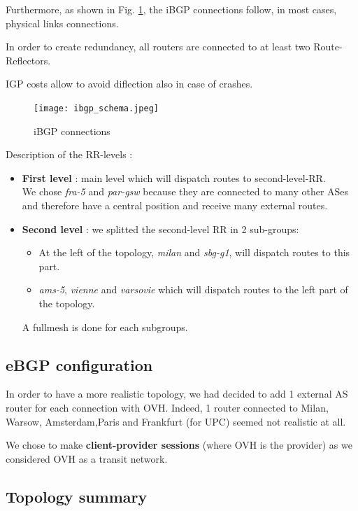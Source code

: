 \documentclass[letter, 9pt, conference]{ieeeconf}
\begin{document}
Furthermore, as shown in Fig. \ref{fig:ibgp_schema}, the iBGP connections follow, in most cases, physical links connections. 

In order to create redundancy, all routers are connected to at least two Route-Reflectors. 

IGP costs allow to avoid diflection also in case of crashes. 

\begin{figure}[h!]
    \texttt{[image: ibgp\_schema.jpeg]}
    \caption{iBGP connections}
    \label{fig:ibgp_schema}
\end{figure}

Description of the RR-levels : 
\begin{itemize}
    \item \textbf{First level} : main level which will dispatch routes to second-level-RR. \\
    We chose \textit{fra-5} and \textit{par-gsw} because they are connected to many other ASes and therefore have a central position and receive many external routes. 
    \item \textbf{Second level} : we splitted the second-level RR in 2 sub-groups:
    \begin{itemize}
        \item At the left of the topology, \textit{milan} and \textit{sbg-g1}, will dispatch routes to this part. 
        \item \textit{ams-5}, \textit{vienne} and \textit{varsovie} which will dispatch routes to the left part of the topology. 
    \end{itemize}
    A fullmesh is done for each subgroups. 
\end{itemize}

\subsection{eBGP configuration}
\label{sec:ebgp}

In order to have a more realistic topology, we had decided to add 1 external AS router for each connection with OVH. Indeed, 1 router connected to Milan, Warsow, Amsterdam,Paris and Frankfurt (for UPC) seemed not realistic at all. 

We chose to make \textbf{client-provider sessions} (where OVH is the provider) as we considered OVH as a transit network. 

\subsection{Topology summary}
\label{sec:summary}
\end{document}
